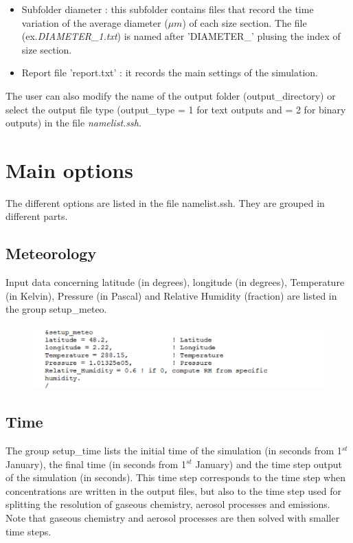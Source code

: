 \documentclass[a4paper,11pt]{article}
\begin{document}
\begin{itemize}
	\item Subfolder diameter : this subfolder contains files that record the time variation of the average diameter ($\mu m$) of each size section. The file (ex.\textit{DIAMETER\_1.txt}) is named after 'DIAMETER\_' plusing the index of size section.
	
	\item Report file 'report.txt' : it records the main settings of the simulation.
\end{itemize}
The user can also modify the name of the output folder (output\_directory) or select the output file type (output\_type = 1 for text outputs and = 2 for binary outputs) in the file \textit{namelist.ssh}.

\section{Main options}

The different options are listed in the file namelist.ssh. They are grouped in different parts.

\subsection{Meteorology}

Input data concerning latitude (in degrees), longitude (in degrees), Temperature (in Kelvin), Pressure (in Pascal) and Relative Humidity (fraction) are listed in the group setup\_meteo. 

\begin{figure}[H]
        \begin{center}
                \includegraphics[angle=0,width=\textwidth]{fig/setupmeteo.png}
       \end{center}
\end{figure}

\subsection{Time}

The group setup\_time lists the initial time of the simulation (in seconds from 1$^{st}$ January), the final time (in seconds from 1$^{st}$ January) and the time step output of the simulation (in seconds). This time step corresponds to the time step when concentrations are written in the output files, but also to the time step used for splitting the resolution of gaseous chemistry, aerosol processes and emissions. Note that gaseous chemistry and aerosol processes are then solved with smaller time steps.
\end{document}
